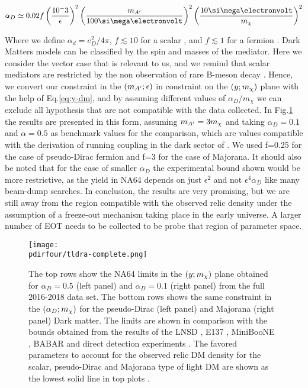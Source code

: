 \begin{equation}
  \label{eq:ad-freeze-out}
  \alpha_D \simeq 0.02 f\left(\frac{10^-3}{\epsilon}\right)^2\left(\frac{m_{\DM}}{100 \mev}\right)^2\left(\frac{10 \mev}{m_{\chi}}\right)^2
\end{equation}

Where we define $\alpha_d = e^2_D/4\pi$, $f\lesssim 10$ for a scalar \cite{deNiverville:2011it}, and $f\lesssim 1$ for a fermion \cite{PhysRevD.91.094026}. Dark Matters models can be classified by the spin and masses of the mediator. Here we consider the vector case that is relevant to us, and we remind that scalar mediators are restricted by the non observation of rare B-meson decay \cite{battaglieri2017cosmic}. Hence, we convert our constraint in the $(m_{A'};\epsilon)$ in constraint on the $(y;m_{\chi})$ plane with the help of Eq.\ref{eq:y-dm}, and by assuming different values of $\alpha_D$/$m_{\chi}$ we can exclude all hypothesis that are not compatible with the data collected. In Fig.\ref{fig:dm-alpha-excl} the results are presented in this form, assuming $m_{A'} = 3m_{\chi}$ and taking $\alpha_D=0.1$ and $\alpha=0.5$ as benchmark values for the comparison, which are values compatible with the derivation of running coupling in the dark sector of \cite{Davoudiasl:2015hxa}. We used f=0.25 for the case of pseudo-Dirac fermion and f=3 for the case of Majorana. It should also be noted that for the case of smaller $\alpha_D$ the experimental bound shown would be more restrictive, as the yield in NA64 depends on just $\epsilon^2$ and not $\epsilon^4 \alpha_D$ like many beam-dump searches. In conclusion, the results are very promising, but we are still away from the region compatible with the observed relic density under the assumption of a freeze-out mechanism taking place in the early universe. A larger number of EOT needs to be collected to be probe that region of parameter space.

\begin{figure}[bth!]
  \centering
  \texttt{[image: \\pdirfour/tldra-complete.png]}
  \caption{The top rows show the NA64 limits in the $(y;m_{\chi})$ plane obtained for $\alpha_D = 0.5$ (left panel) and $\alpha_D = 0.1$ (right panel) from the full 2016-2018 data set. The bottom rows shows the same constraint in the $(\alpha_D;m_{\chi})$ for the pseudo-Dirac (left panel) and Majorana (right panel) Dark matter. The limits are shown in comparison with the bounds obtained from the results of the LNSD \cite{deNiverville:2011it}, E137 \cite{e137}, MiniBooNE \cite{Aguilar-Arevalo:2018wea}, BABAR \cite{babar1} and direct detection experiments \cite{Essig:2012yx}. The favored parameters to account for the observed relic DM density for the scalar, pseudo-Dirac and Majorana type of light DM are shown as the lowest solid line in top plots \cite{Berlin:2018bsc}.}
  \label{fig:dm-alpha-excl}
\end{figure}

